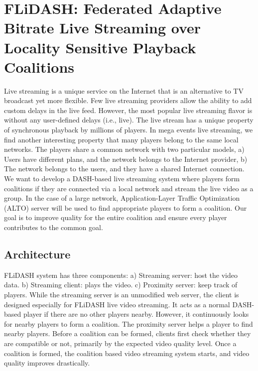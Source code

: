 \section{FLiDASH: Federated Adaptive Bitrate Live Streaming over Locality Sensitive Playback Coalitions}
Live streaming is a unique service on the Internet that is an alternative to TV broadcast yet more flexible. Few live streaming providers allow the ability to add custom delays in the live feed. However, the most popular live streaming flavor is without any user-defined delays (i.e., live). The live stream has a unique property of synchronous playback by millions of players. In mega events live streaming, we find another interesting property that many players belong to the same local networks. The players share a common network with two particular models, a) Users have different plans, and the network belongs to the Internet provider, b) The network belongs to the users, and they have a shared Internet connection. We want to develop a DASH-based live streaming system where players form coalitions if they are connected via a local network and stream the live video as a group. In the case of a large network, Application-Layer Traffic Optimization (ALTO) server will be used to find appropriate players to form a coalition. Our goal is to improve quality for the entire coalition and ensure every player contributes to the common goal.

\subsection{Architecture}
FLiDASH system has three components: a) Streaming server: host the video data. b) Streaming client: plays the video. c) Proximity server: keep track of players. While the streaming server is an unmodified web server, the client is designed especially for FLiDASH live video streaming. It acts as a normal DASH-based player if there are no other players nearby. However, it continuously looks for nearby players to form a coalition. The proximity server helps a player to find nearby players. Before a coalition can be formed, clients first check whether they are compatible or not, primarily by the expected video quality level. Once a coalition is formed, the coalition based video streaming system starts, and video quality improves drastically.
